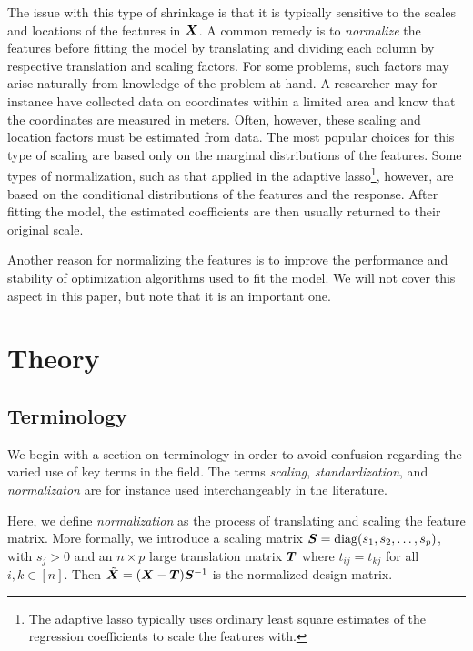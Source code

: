 
The issue with this type of shrinkage is that it is typically sensitive to the scales and locations of the features in \(\mat X\).
A common remedy is to \emph{normalize} the features before fitting the model by translating and dividing each column by respective translation and scaling factors.
For some problems, such factors may arise naturally from knowledge of the problem at hand.
A researcher may for instance have collected data on coordinates within a limited area and know that the coordinates are measured in meters.
Often, however, these scaling and location factors must be estimated from data.
The most popular choices for this type of scaling are based only on the marginal distributions of the features.
Some types of normalization, such as that applied in the adaptive lasso\footnote{The adaptive lasso typically uses ordinary least square estimates of the regression coefficients to scale the features with.}, however, are based on the conditional distributions of the features and the response.
After fitting the model, the estimated coefficients are then usually returned to their original scale.

Another reason for normalizing the features is to improve the performance and stability of optimization algorithms used to fit the model.
We will not cover this aspect in this paper, but note that it is an important one.

\section{Theory}

\subsection{Terminology}

We begin with a section on terminology in order to avoid confusion regarding the varied use of key terms in the field. The terms \emph{scaling}, \emph{standardization}, and \emph{normalizaton} are for instance used interchangeably in the literature.

Here, we define \emph{normalization} as the process of translating and scaling the feature matrix.
More formally, we introduce a scaling matrix \(\mat S = \diag(s_1, s_2, \dots, s_p)\), with \(s_j > 0\) and an \(n \times p\) large translation matrix \(\mat T\) where \(t_{ij} = t_{kj}\) for all \(i,k \in [n]\). Then \(\tilde{\mat X} = (\mat X - \mat T) \mat S^{-1}\) is the normalized design matrix.

